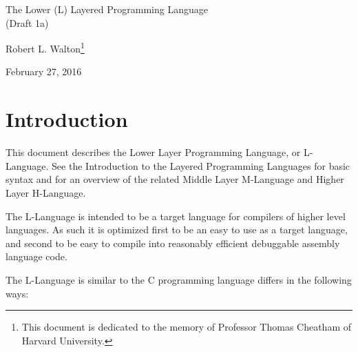 \documentclass[12pt]{article}
\makeatletter
\renewcommand\tableofcontents{%
    \begin{list}{}%
	     {\setlength{\itemsep}{0in}%
	      \setlength{\topsep}{0in}%
	      \setlength{\parsep}{1ex}%
	      \setlength{\labelwidth}{0in}%
	      \setlength{\baselineskip}{1.5ex}%
	      \setlength{\leftmargin}{1.0in}%
	      \setlength{\rightmargin}{1.0in}}%
    \item\@starttoc{toc}%
    \end{list}}
\makeatother
\begin{document}
        
\begin{center}

{\Large
The Lower (L) Layered Programming Language \\[0.5ex]
(Draft 1a)}

\medskip

Robert L. Walton\footnote{This document is dedicated to the memory
of Professor Thomas Cheatham of Harvard University.}

February 27, 2016
 
\end{center}

{\small \tableofcontents}

\newpage

\section{Introduction}

This document describes the Lower Layer Programming Language, or
L-Language.  See the Introduction to the Layered
Programming Languages for basic syntax and for an overview of the related
Middle Layer M-Language and Higher Layer H-Language.

The L-Language is intended to be a target language for compilers of
higher level languages.  As such it is optimized first to be an easy to 
use as a target language, and second to be easy to
compile into reasonably efficient debuggable assembly language code.

The L-Language is similar to the C programming language
differs in the following ways:
\end{document}
